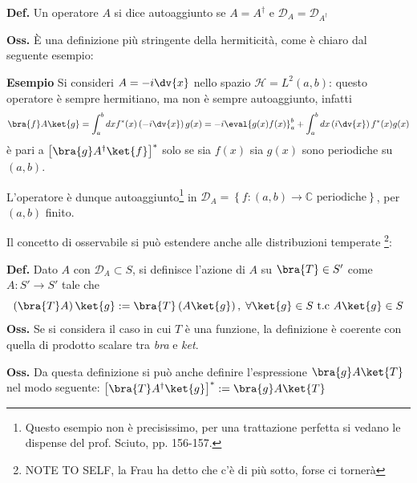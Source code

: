 \textbf{Def.} Un operatore $ A $ si dice autoaggiunto se $ A = A^{\dagger} $ e
$\mathcal{D}_A = \mathcal{D}_{A^{\dagger}}$

\textbf{Oss.} È una definizione più stringente della hermiticità, come è chiaro dal seguente
esempio:

\textbf{Esempio} Si consideri $ A = -i\dv{x} $ nello spazio $ \mathcal{H} = L^2(a,b) $: 
questo operatore è sempre hermitiano, ma non è sempre autoaggiunto, infatti
$$ \bra{f}A\ket{g} = \int_{a}^{b}dxf^*(x)\left(-i\dv{x}\right)g(x) =
-i\eval{g(x)f(x)}_a^b + \int_{a}^{b}dx\left(i\dv{x}\right)f^*(x)g(x)$$
è pari a $ \left[ \bra{g}A^{\dagger}\ket{f} \right]^* $ solo se sia $ f(x) $ sia $ g(x) $
sono periodiche su $ (a,b) $.

L'operatore è dunque autoaggiunto\footnote{Questo esempio non è precisissimo, per una trattazione
perfetta si vedano le dispense del prof. Sciuto, pp. 156-157.} in
$ \mathcal{D}_A = \left\{ f:(a,b)\to\mathbb{C} \text{ periodiche} \right\}$, per $ (a,b)$ finito.

Il concetto di osservabile si può estendere anche alle distribuzioni temperate
\footnote{NOTE TO SELF, la Frau ha detto che c'è di più sotto, forse ci tornerà}:

\textbf{Def.} Dato $ A$ con $ \mathcal{D}_A\subset S $, si definisce l'azione di $ A $ su 
$ \bra{T} \in S'$ come $ A: S'\to S' $ tale che
$$ \left(\bra{T}A\right)\ket{g} := \bra{T}\left(A\ket{g}\right),\; \forall \ket{g}\in S \text{ t.c } A\ket{g}\in S$$
\textbf{Oss.} Se si considera il caso in cui $ T$ è una funzione, la definizione è coerente con
quella di prodotto scalare tra \textit{bra} e \textit{ket}.

\textbf{Oss.} Da questa definizione si può anche definire l'espressione $\bra{g}A\ket{T}$
nel modo seguente: $ \left[\bra{T}A^{\dagger}\ket{g}\right]^* := \bra{g}A\ket{T} $ 
